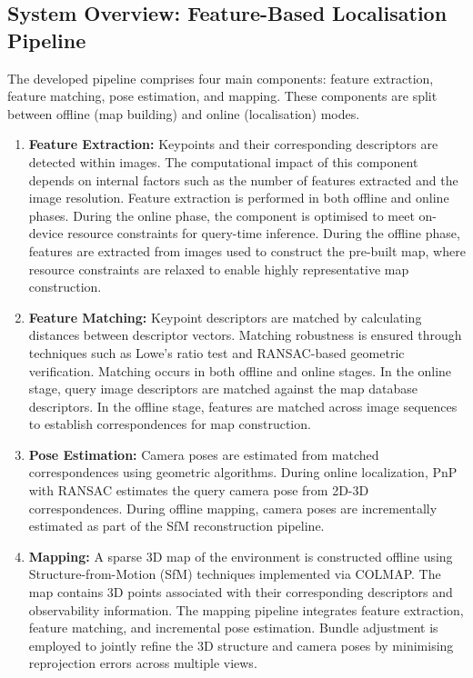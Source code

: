 \documentclass[12pt]{article}
\begin{document}
\subsection{System Overview: Feature-Based Localisation Pipeline}

The developed pipeline comprises four main components: feature extraction, feature matching, pose estimation, and mapping. These components are split between offline (map building) and online (localisation) modes.

\begin{enumerate}

\item \textbf{Feature Extraction:} Keypoints and their corresponding descriptors are detected within images. The computational impact of this component depends on internal factors such as the number of features extracted and the image resolution. Feature extraction is performed in both offline and online phases. During the online phase, the component is optimised to meet on-device resource constraints for query-time inference. During the offline phase, features are extracted from images used to construct the pre-built map, where resource constraints are relaxed to enable highly representative map construction.

\item \textbf{Feature Matching:} Keypoint descriptors are matched by calculating distances between descriptor vectors. Matching robustness is ensured through techniques such as Lowe's ratio test and RANSAC-based geometric verification. Matching occurs in both offline and online stages. In the online stage, query image descriptors are matched against the map database descriptors. In the offline stage, features are matched across image sequences to establish correspondences for map construction.

\item \textbf{Pose Estimation:} Camera poses are estimated from matched correspondences using geometric algorithms. During online localization, PnP with RANSAC estimates the query camera pose from 2D-3D correspondences. During offline mapping, camera poses are incrementally estimated as part of the SfM reconstruction pipeline.

\item \textbf{Mapping:} A sparse 3D map of the environment is constructed offline using Structure-from-Motion (SfM) techniques implemented via COLMAP. The map contains 3D points associated with their corresponding descriptors and observability information. The mapping pipeline integrates feature extraction, feature matching, and incremental pose estimation. Bundle adjustment is employed to jointly refine the 3D structure and camera poses by minimising reprojection errors across multiple views.

\end{enumerate}
\end{document}

